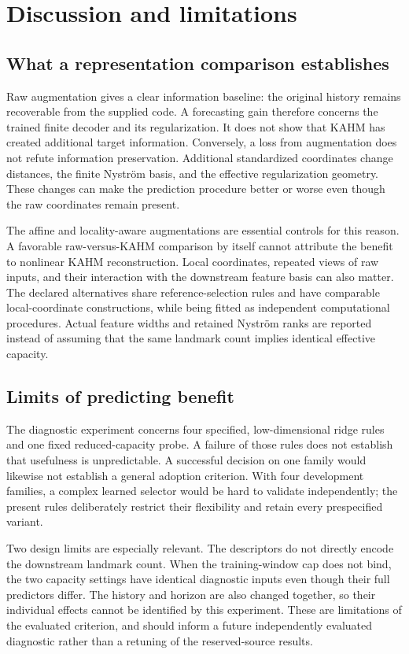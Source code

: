 \section{Discussion and limitations}\label{sec:discussion}


\subsection{What a representation comparison establishes}
Raw augmentation gives a clear information baseline: the original history
remains recoverable from the supplied code. A forecasting gain therefore
concerns the trained finite decoder and its regularization. It does not show
that KAHM has created additional target information. Conversely, a loss from
augmentation does not refute information preservation. Additional standardized
coordinates change distances, the finite Nystr\"om basis, and the effective
regularization geometry. These changes can make the prediction procedure
better or worse even though the raw coordinates remain present.

The affine and locality-aware augmentations are essential controls for this
reason. A favorable raw-versus-KAHM comparison by itself cannot attribute the
benefit to nonlinear KAHM reconstruction. Local coordinates, repeated views
of raw inputs, and their interaction with the downstream feature basis can
also matter. The declared alternatives share reference-selection rules and
have comparable local-coordinate constructions, while being fitted as
independent computational procedures. Actual feature widths and retained
Nystr\"om ranks are reported instead of assuming that the same landmark
count implies identical effective capacity.

\subsection{Limits of predicting benefit}
The diagnostic experiment concerns four specified, low-dimensional ridge
rules and one fixed reduced-capacity probe. A failure of those rules does
not establish that usefulness is unpredictable. A successful decision on
one family would likewise not establish a general adoption criterion.
With four development families, a complex learned selector would be hard
to validate independently; the present rules deliberately restrict their
flexibility and retain every prespecified variant.

Two design limits are especially relevant. The descriptors do not directly
encode the downstream landmark count. When the training-window cap does
not bind, the two capacity settings have identical diagnostic inputs even
though their full predictors differ. The history and horizon are also
changed together, so their individual effects cannot be identified by this
experiment. These are limitations of the evaluated criterion, and should
inform a future independently evaluated diagnostic rather than a retuning
of the reserved-source results.

